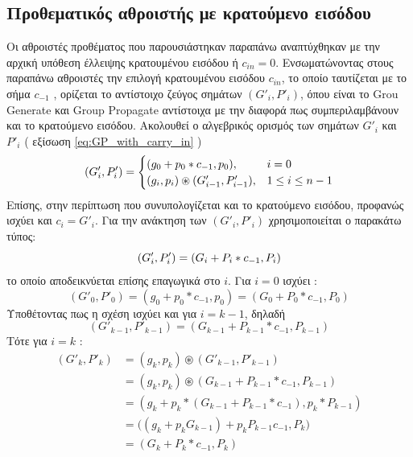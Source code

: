 \subsection{Προθεματικός αθροιστής με κρατούμενο εισόδου}
Οι αθροιστές προθέματος που παρουσιάστηκαν παραπάνω αναπτύχθηκαν με την αρχική
υπόθεση έλλειψης κρατουμένου εισόδου ή $c_{in} = 0$. Ενσωματώνοντας στους παραπάνω 
αθροιστές την επιλογή κρατουμένου εισόδου $c_{in}$, το οποίο ταυτίζεται με το σήμα $c_{-1}$
, ορίζεται το αντίστοιχο ζεύγος σημάτων $(G'_i,P'_i)$, όπου είναι το Grou Generate και 
Group Propagate αντίστοιχα με την διαφορά πως συμπεριλαμβάνουν και το κρατούμενο εισόδου.
Ακολουθεί ο αλγεβρικός ορισμός των σημάτων $G'_i$ και $P'_i$ ( εξίσωση \ref{eq:GP_with_carry_in} )
\begin{equation}
    \equationame{Αλγεβρικός ορισμός των $(G'_i,P'_i)$}
    \label{eq:GP_with_carry_in}
    (G'_i,P'_i) = 
    \begin{cases}
        (g_0 + p_0*c_{-1} , p_0)   , & i = 0\\
        (g_i,p_i)\circledast (G'_{i-1},P'_{i-1}) , & 1 \leq i \leq n-1
    \end{cases}
\end{equation}
Επίσης, στην περίπτωση που συνυπολογίζεται και το κρατούμενο εισόδου, προφανώς ισχύει και 
$c_i = G'_i$. Για την ανάκτηση των $(G'_i,P'_i)$ χρησιμοποιείται ο παρακάτω τύπος:
\begin{equation}
    \label{eq:G'P'_From_GP}
    \equationame{Ανάκτηση των $(G'_i,P'_i)$ από $(G_i,P_i)$}
    (G'_i,P'_i) = (G_i + P_i*c_{-1} , P_i)
\end{equation}
το οποίο αποδεικνύεται επίσης επαγωγικά στο $i$. Για $i=0$ ισχύει :
\begin{equation*}
    (G'_0,P'_0) = (g_0 + p_0*c_{-1} , p_0) =  (G_0 + P_0*c_{-1} , P_0)
\end{equation*}
Υποθέτοντας πως η σχέση ισχύει και για $i=k-1$, δηλαδή
\begin{equation*}
    (G'_{k-1},P'_{k-1}) = (G_{k-1} + P_{k-1}*c_{-1} , P_{k-1})
\end{equation*}
Τότε για $i=k$ :
\begin{equation*}
    \begin{split}
        (G'_k,P'_k) &= (g_k,p_k) \circledast (G'_{k-1},P'_{k-1})\\
                    &= (g_k,p_k) \circledast (G_{k-1} + P_{k-1}*c_{-1} , P_{k-1}) \\
                    &= ( g_k + p_k*(G_{k-1} + P_{k-1}*c_{-1}) , p_k*P_{k-1} ) \\
                    &= \big( (g_k + p_kG_{k-1}) + p_kP_{k-1}c_{-1} , P_k  \big) \\
                    &= ( G_k + P_k*c_{-1} , P_k )
    \end{split}
\end{equation*}
